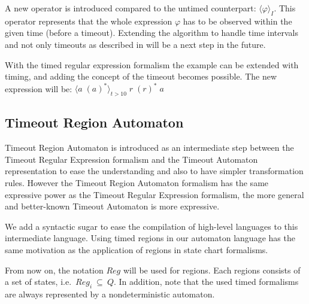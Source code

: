 	
			A new operator is introduced compared to the untimed counterpart: $\langle \varphi \rangle_I$. This operator represents that the whole expression $\varphi$ has to be observed within the given time (before a timeout).	
			Extending the algorithm to handle time intervals and not only timeouts as described in \citep{tre} will be a next step in the future.
	
			With the timed regular expression formalism the example can be extended with timing, and adding the concept of the timeout becomes possible.
			The new expression will be: $ \langle a \; (a)^\ast \rangle_{t > 10} \; r \; (r)^\ast \; a$
			
			\subsection{Timeout Region Automaton}
			
			Timeout Region Automaton is introduced as an intermediate step between the Timeout Regular Expression formalism and the Timeout Automaton representation to ease the understanding and also to have simpler transformation rules.
			However the Timeout Region Automaton formalism has the same expressive power as the Timeout Regular Expression formalism, the more general and better-known Timeout Automaton is more expressive.
			
			We add a syntactic sugar to ease the compilation of high-level languages to this intermediate language.
			Using timed regions in our automaton language has the same motivation as the application of regions in state chart formalisms.
			
			From now on, the notation $\mathit{Reg}$ will be used for regions. Each regions consists of a  set of states, i.e.~$\mathit{Reg}_{i}~\subseteq~Q$. In addition, note that the used timed formalisms are always represented by a nondeterministic automaton.
			
